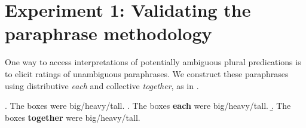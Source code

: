 \documentclass[preprint,12pt,authoryear,titlepage]{elsarticle}
\begin{document}
%

\section{Experiment 1: Validating the paraphrase methodology}

One way to access interpretations of potentially ambiguous plural predications is to elicit ratings of unambiguous paraphrases. We construct these paraphrases using distributive \emph{each} and collective \emph{together}, as in \Next.

\ex. \label{bare}The boxes were big/heavy/tall.
\a.\label{each} The boxes \textbf{each} were big/heavy/tall.
\b.\label{together} The boxes \textbf{together} were big/heavy/tall.
\end{document}
